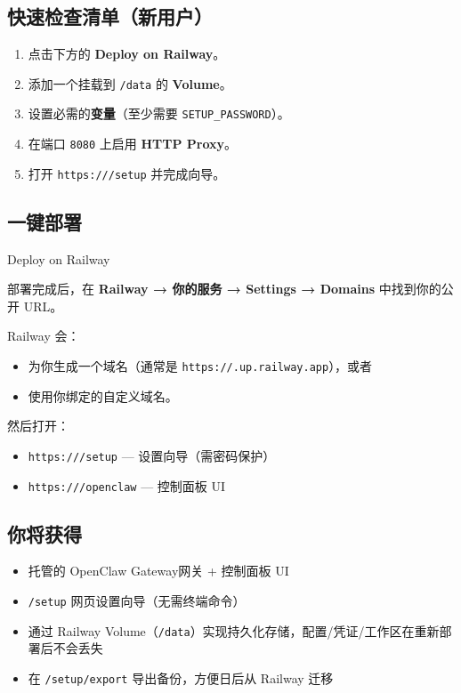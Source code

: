 \subsection{快速检查清单（新用户）}


\begin{enumerate}
  \item 点击下方的 \textbf{Deploy on Railway}。
  \item 添加一个挂载到 \texttt{/data} 的 \textbf{Volume}。
  \item 设置必需的\textbf{变量}（至少需要 \texttt{SETUP\_PASSWORD}）。
  \item 在端口 \texttt{8080} 上启用 \textbf{HTTP Proxy}。
  \item 打开 \texttt{https:///setup} 并完成向导。
\end{enumerate}


\subsection{一键部署}


Deploy on Railway

部署完成后，在 \textbf{Railway → 你的服务 → Settings → Domains} 中找到你的公开 URL。

Railway 会：

\begin{itemize}
  \item 为你生成一个域名（通常是 \texttt{https://.up.railway.app}），或者
  \item 使用你绑定的自定义域名。
\end{itemize}


然后打开：

\begin{itemize}
  \item \texttt{https:///setup} — 设置向导（需密码保护）
  \item \texttt{https:///openclaw} — 控制面板 UI
\end{itemize}


\subsection{你将获得}


\begin{itemize}
  \item 托管的 OpenClaw Gateway网关 + 控制面板 UI
  \item \texttt{/setup} 网页设置向导（无需终端命令）
  \item 通过 Railway Volume（\texttt{/data}）实现持久化存储，配置/凭证/工作区在重新部署后不会丢失
  \item 在 \texttt{/setup/export} 导出备份，方便日后从 Railway 迁移
\end{itemize}



